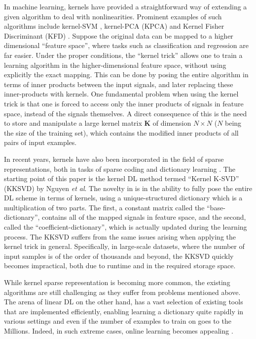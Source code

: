 \documentclass[journal]{IEEEtran}
\newcommand{\bK}{\mathbf{K}}
\begin{document}
In machine learning, kernels have provided a straightforward way of extending a given algorithm to deal with nonlinearities. Prominent examples of such algorithms include kernel-SVM \cite{KSVM}, kernel-PCA (KPCA) \cite{KPCA} and Kernel Fisher Discriminant (KFD) \cite{KFD}. Suppose the original data can be mapped to a higher dimensional ``feature space'', where tasks such as classification and regression are far easier. Under the proper conditions, the ``kernel trick'' allows one to train a learning algorithm in the higher-dimensional feature space, without using explicitly the exact mapping. This can be done by posing the entire algorithm in terms of inner products between the input signals, and later replacing these inner-products with kernels. One fundamental problem when using the kernel trick is that one is forced to access only the inner products of signals in feature space, instead of the signals themselves. A direct consequence of this is the need to store and manipulate a large kernel matrix $\bK$ of dimension $N \times N$ ($N$ being the size of the training set), which contains the modified inner products of all pairs of input examples.

In recent years, kernels have also been incorporated in the field of sparse representations, both in tasks of sparse coding \cite{KMP,KBP,KSR,KernelOMP,KernelSRC1,KernelSRC2,KernelSRC3} and dictionary learning \cite{KDL,KSR,SPSDKDL,KDL2,KernelizedDL,KDL3}. The starting point of this paper is the kernel DL method termed ``Kernel K-SVD'' (KKSVD) by Nguyen \textit{et al}.
The novelty in \cite{KDL} is in the ability to fully pose the entire DL scheme in terms of kernels, using a unique-structured dictionary which is a multiplication of two parts. The first, a constant matrix called the ``base-dictionary'', contains all of the mapped signals in feature space, and the second, called the ``coefficient-dictionary'', which is actually updated during the learning process.
The KKSVD suffers from the same issues arising when applying the kernel trick in general. Specifically, in large-scale datasets, where the number of input samples is of the order of thousands and beyond, the KKSVD quickly becomes impractical, both due to runtime and in the required storage space.

While kernel sparse representation is becoming more common, the existing algorithms are still challenging as they suffer from problems mentioned above. The arena of linear DL on the other hand, has a vast selection of existing tools that are implemented efficiently, enabling learning a dictionary quite rapidly in various settings and even if the number of examples to train on goes to the Millions. Indeed, in such extreme cases, online learning becomes appealing \cite{OnlineDic,OnlineDic2}.
\end{document}
